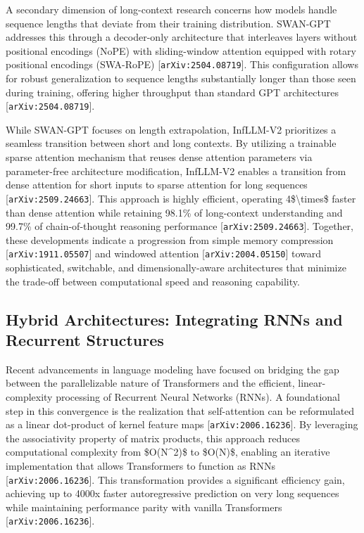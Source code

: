 \documentclass[11pt]{article}
\begin{document}
A secondary dimension of long-context research concerns how models handle sequence lengths that deviate from their training distribution. SWAN-GPT addresses this through a decoder-only architecture that interleaves layers without positional encodings (NoPE) with sliding-window attention equipped with rotary positional encodings (SWA-RoPE) [\texttt{arXiv:2504.08719}]. This configuration allows for robust generalization to sequence lengths substantially longer than those seen during training, offering higher throughput than standard GPT architectures [\texttt{arXiv:2504.08719}].

While SWAN-GPT focuses on length extrapolation, InfLLM-V2 prioritizes a seamless transition between short and long contexts. By utilizing a trainable sparse attention mechanism that reuses dense attention parameters via parameter-free architecture modification, InfLLM-V2 enables a transition from dense attention for short inputs to sparse attention for long sequences [\texttt{arXiv:2509.24663}]. This approach is highly efficient, operating 4\$\textbackslash{}times\$ faster than dense attention while retaining 98.1\% of long-context understanding and 99.7\% of chain-of-thought reasoning performance [\texttt{arXiv:2509.24663}]. Together, these developments indicate a progression from simple memory compression [\texttt{arXiv:1911.05507}] and windowed attention [\texttt{arXiv:2004.05150}] toward sophisticated, switchable, and dimensionally-aware architectures that minimize the trade-off between computational speed and reasoning capability.

\subsection{Hybrid Architectures: Integrating RNNs and Recurrent Structures}

Recent advancements in language modeling have focused on bridging the gap between the parallelizable nature of Transformers and the efficient, linear-complexity processing of Recurrent Neural Networks (RNNs). A foundational step in this convergence is the realization that self-attention can be reformulated as a linear dot-product of kernel feature maps [\texttt{arXiv:2006.16236}]. By leveraging the associativity property of matrix products, this approach reduces computational complexity from \$O(N\textasciicircum{}2)\$ to \$O(N)\$, enabling an iterative implementation that allows Transformers to function as RNNs [\texttt{arXiv:2006.16236}]. This transformation provides a significant efficiency gain, achieving up to 4000x faster autoregressive prediction on very long sequences while maintaining performance parity with vanilla Transformers [\texttt{arXiv:2006.16236}].
\end{document}
